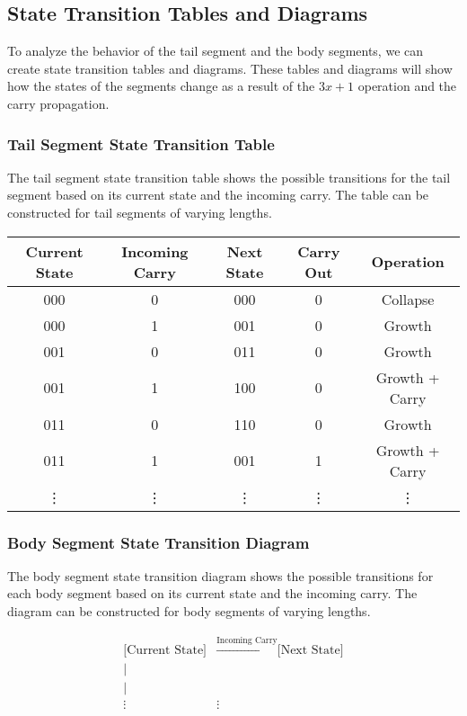 \documentclass{article}
\begin{document}
\subsection{State Transition Tables and Diagrams}
To analyze the behavior of the tail segment and the body segments, we can create state transition tables and diagrams. These tables and diagrams will show how the states of the segments change as a result
of the $3x + 1$ operation and the carry propagation.

\subsubsection{Tail Segment State Transition Table}
The tail segment state transition table shows the possible transitions for the tail segment based on its current state and the incoming carry. The table can be constructed for tail segments of varying lengths.

\begin{tabular}{|c|c|c|c|c|}
\hline
\textbf{Current State} & \textbf{Incoming Carry} & \textbf{Next State} & \textbf{Carry Out} & \textbf{Operation} \\
\hline
000 & 0 & 000 & 0 & Collapse \\
000 & 1 & 001 & 0 & Growth \\
001 & 0 & 011 & 0 & Growth \\
001 & 1 & 100 & 0 & Growth + Carry \\
011 & 0 & 110 & 0 & Growth \\
011 & 1 & 001 & 1 & Growth + Carry \\
\vdots & \vdots & \vdots & \vdots & \vdots \\
\hline
\end{tabular}

\subsubsection{Body Segment State Transition Diagram}
The body segment state transition diagram shows the possible transitions for each body segment based on its current state and the incoming carry. The diagram can be constructed for body segments of varying lengths.

\begin{align*}
\text{[Current State]} &\xrightarrow{\text{Incoming Carry}} \text{[Next State]} \\
       | & \\
       | & \\
      \vdots & \vdots
\end{align*}
\end{document}

